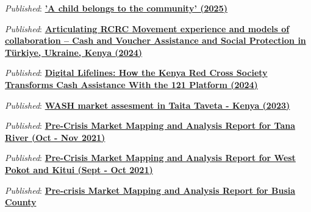 \documentclass[line,margin,10pt]{res}
\begin{document}
\begin{resume}
{\sl Published}: \textbf{\href{https://arcg.is/0i4fqm1}{'A child belongs to the community' (2025)}}

{\sl Published}: \textbf{\href{https://cash-hub.org/resource/articulating-rcrc-movement-experience-and-models-of-collaboration-cash-and-voucher-assistance-and-social-protection-in-turkiye-ukraine-kenya/}{Articulating RCRC Movement experience and models of collaboration – Cash and Voucher Assistance and Social Protection in Türkiye, Ukraine, Kenya (2024)}}

{\sl Published}: \textbf{\href{https://510.global/2024/06/digital-lifelines-how-the-kenya-red-cross-society-transforms-cash-assistance-with-the-121-platform/}{Digital Lifelines: How the Kenya Red Cross Society Transforms Cash Assistance With the 121 Platform (2024)}}

{\sl Published}: \textbf{\href{https://www.dropbox.com/s/qs9067pr9a9tok1/2023_WASH Market assessment Taveta report_final.pdf?dl=0}{WASH market assesment in Taita Taveta - Kenya (2023)}}

{\sl Published}: \textbf{\href{https://reliefweb.int/node/3928348}{Pre-Crisis Market Mapping and Analysis Report for Tana River (Oct - Nov 2021)}}

{\sl Published}: \textbf{\href{https://reliefweb.int/node/3928350}{Pre-Crisis Market Mapping and Analysis Report for West Pokot and Kitui (Sept - Oct 2021)}}

{\sl Published}: \textbf{\href{https://reliefweb.int/node/3935263}{Pre-crisis Market Mapping and Analysis Report for Busia County}}

{\vspace{-0.25cm}}


\end{resume}
\end{document}
